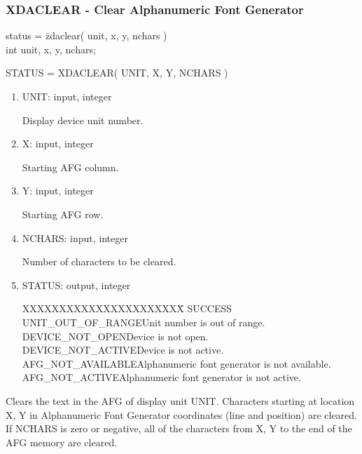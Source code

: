 \subsubsection{XDACLEAR - Clear Alphanumeric Font Generator}
\begin{tabbing}
status = \=zdaclear( unit, x, y, nchars )\\
\>int  unit, x, y, nchars;\\
\end{tabbing}
STATUS = XDACLEAR( UNIT, X, Y, NCHARS )
\begin{enumerate}
\item UNIT:  input, integer

Display device unit number.
\item X:  input, integer

Starting AFG column.
\item Y:  input, integer

Starting AFG row.
\item NCHARS:  input, integer

Number of characters to be cleared.
\item STATUS:  output, integer
\begin{tabbing}
XXXXXXXXXXXXXXXXXXXXXX\=\kill
SUCCESS\\
UNIT\_OUT\_OF\_RANGE\>Unit number is out of range.\\
DEVICE\_NOT\_OPEN\>Device is not open.\\
DEVICE\_NOT\_ACTIVE\>Device is not active.\\
AFG\_NOT\_AVAILABLE\>Alphanumeric font generator is not available.\\
AFG\_NOT\_ACTIVE\>Alphanumeric font generator is not active.\\
\end{tabbing}
\end{enumerate}
Clears the text in the AFG of display unit UNIT.  Characters starting
at location X, Y in Alphanumeric Font Generator coordinates (line and
position) are cleared.  If NCHARS is zero or negative, all of the
characters from X, Y to the end of the AFG memory are cleared.
\newpage
